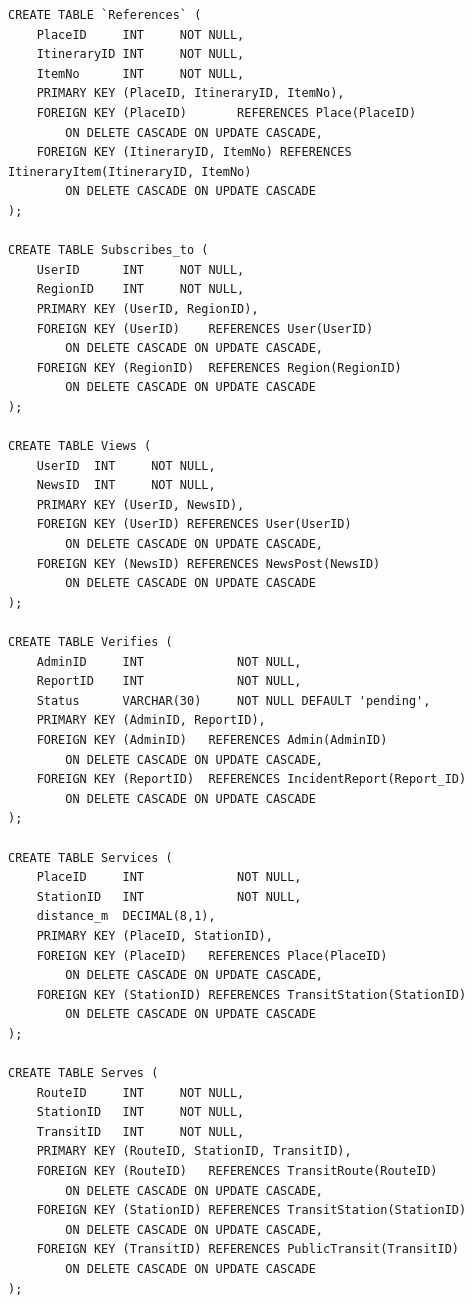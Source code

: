\begin{lstlisting}[language=MySQL,caption={Full database schema (DDL).},label={lst:ddl}]
CREATE TABLE `References` (
    PlaceID     INT     NOT NULL,
    ItineraryID INT     NOT NULL,
    ItemNo      INT     NOT NULL,
    PRIMARY KEY (PlaceID, ItineraryID, ItemNo),
    FOREIGN KEY (PlaceID)       REFERENCES Place(PlaceID)
        ON DELETE CASCADE ON UPDATE CASCADE,
    FOREIGN KEY (ItineraryID, ItemNo) REFERENCES ItineraryItem(ItineraryID, ItemNo)
        ON DELETE CASCADE ON UPDATE CASCADE
);

CREATE TABLE Subscribes_to (
    UserID      INT     NOT NULL,
    RegionID    INT     NOT NULL,
    PRIMARY KEY (UserID, RegionID),
    FOREIGN KEY (UserID)    REFERENCES User(UserID)
        ON DELETE CASCADE ON UPDATE CASCADE,
    FOREIGN KEY (RegionID)  REFERENCES Region(RegionID)
        ON DELETE CASCADE ON UPDATE CASCADE
);

CREATE TABLE Views (
    UserID  INT     NOT NULL,
    NewsID  INT     NOT NULL,
    PRIMARY KEY (UserID, NewsID),
    FOREIGN KEY (UserID) REFERENCES User(UserID)
        ON DELETE CASCADE ON UPDATE CASCADE,
    FOREIGN KEY (NewsID) REFERENCES NewsPost(NewsID)
        ON DELETE CASCADE ON UPDATE CASCADE
);

CREATE TABLE Verifies (
    AdminID     INT             NOT NULL,
    ReportID    INT             NOT NULL,
    Status      VARCHAR(30)     NOT NULL DEFAULT 'pending',
    PRIMARY KEY (AdminID, ReportID),
    FOREIGN KEY (AdminID)   REFERENCES Admin(AdminID)
        ON DELETE CASCADE ON UPDATE CASCADE,
    FOREIGN KEY (ReportID)  REFERENCES IncidentReport(Report_ID)
        ON DELETE CASCADE ON UPDATE CASCADE
);

CREATE TABLE Services (
    PlaceID     INT             NOT NULL,
    StationID   INT             NOT NULL,
    distance_m  DECIMAL(8,1),
    PRIMARY KEY (PlaceID, StationID),
    FOREIGN KEY (PlaceID)   REFERENCES Place(PlaceID)
        ON DELETE CASCADE ON UPDATE CASCADE,
    FOREIGN KEY (StationID) REFERENCES TransitStation(StationID)
        ON DELETE CASCADE ON UPDATE CASCADE
);

CREATE TABLE Serves (
    RouteID     INT     NOT NULL,
    StationID   INT     NOT NULL,
    TransitID   INT     NOT NULL,
    PRIMARY KEY (RouteID, StationID, TransitID),
    FOREIGN KEY (RouteID)   REFERENCES TransitRoute(RouteID)
        ON DELETE CASCADE ON UPDATE CASCADE,
    FOREIGN KEY (StationID) REFERENCES TransitStation(StationID)
        ON DELETE CASCADE ON UPDATE CASCADE,
    FOREIGN KEY (TransitID) REFERENCES PublicTransit(TransitID)
        ON DELETE CASCADE ON UPDATE CASCADE
);


\end{lstlisting}
